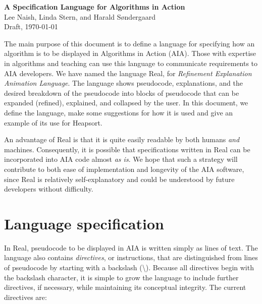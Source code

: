 \documentclass[11pt]{article}
\begin{document}
\begin{center}
{\LARGE\bf A Specification Language for Algorithms in Action} \\[1ex]
Lee Naish, Linda Stern, and Harald S{\o}ndergaard \\
Draft, \today
\end{center}

The main purpose of this document is to define a language for
specifying how an algorithm is to be displayed in Algorithms in Action
(AIA). Those with expertise in algorithms and teaching can use this
language to communicate requirements to AIA developers.  We have named
the language Real, for {\it Refinement Explanation Animation Language}.
The language shows pseudocode, explanations, and the desired breakdown of
the pseudocode into blocks of pseudocode that can be expanded (refined),
explained, and collapsed by the user.  In this document, we define the
language, make some suggestions for how it is used and give an example
of its use for Heapsort.

An advantage of Real is that it is quite easily readable by both humans
\emph{and} machines.  Consequently, it is possible that specifications
written in Real can be incorporated into AIA code almost \emph{as
is}.  We hope that such a strategy will contribute to both ease
of implementation and longevity of the AIA software, since Real is
relatively self-explanatory and could be understood by future developers
without difficulty.


\section{Language specification}

In Real, pseudocode to be displayed in AIA is written simply as lines
of text.  The language also contains {\it directives}, or instructions,
that are distinguished from lines of pseudocode by starting with a
backslash (\textbackslash).  Because all directives begin with the
backslash character, it is simple to grow the language to include further
directives, if necessary, while maintaining its conceptual integrity.
The current directives are:
\end{document}
